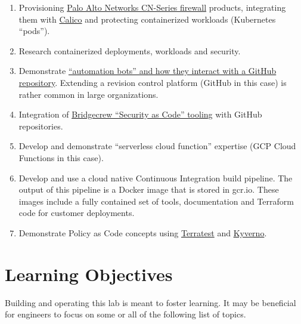 \begin{raggedright}
	\begin{enumerate}
		\item Provisioning \href{https://docs.paloaltonetworks.com/cn-series.html}{Palo Alto Networks CN-Series firewall} products, integrating
		them with \href{https://www.tigera.io/project-calico/}{Calico} and protecting containerized workloads (Kubernetes ``pods'').
		\item Research containerized deployments, workloads and security.
		\item Demonstrate \href{https://github.com/probot/probot}{``automation bots'' and how they interact with a GitHub repository}. Extending a
		revision control platform (GitHub in this case) is rather common in large organizations.
		\item Integration of \href{https://docs.bridgecrew.io/docs}{Bridgecrew ``Security as Code'' tooling} with GitHub repositories.
		\item Develop and demonstrate ``serverless cloud function'' expertise (GCP Cloud Functions in this case).
		\item Develop and use a cloud native Continuous Integration build pipeline. The output of this pipeline is a Docker image that is stored
		in gcr.io. These images include a fully contained set of tools, documentation and Terraform code for customer deployments.
		\item Demonstrate Policy as Code concepts using \href{https://www.accurics.com/products/terrascan/}{Terratest} and 
		\href{https://kyverno.io/}{Kyverno}.
	\end{enumerate}
\end{raggedright}
\vspace{2mm}


\section{\label{sec:LO}Learning Objectives}
\vspace{2mm}

\justifying
Building and operating this lab is meant to foster learning. It may be beneficial for engineers to focus on some or all of the
following list of topics.

